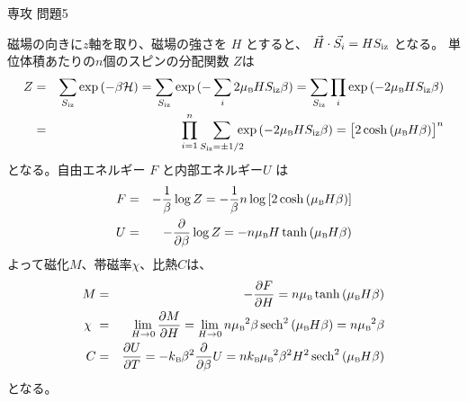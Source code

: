 \documentclass[fleqn]{jbook}
\begin{document}
\begin{answer}{専攻 問題5}{}
\def\sech{\mathop{\rm sech}\nolimits}

\begin{subanswers}
\SubAnswer
  磁場の向きに$z$軸を取り、磁場の強さを $H$ とすると、
  $\vec{H} \cdot \vec{S_i} = H S_{\rm iz}$ となる。
  単位体積あたりの$n$個のスピンの分配関数 $Z$は
%
  \begin{eqnarray*}
    Z &=& \sum_{S_{\rm iz}} \exp{(-\beta {\cal H})}%
       =  \sum_{S_{\rm iz}} \exp{(-\sum_{i}2\muB H S_{\rm iz} \beta)}%
       =  \sum_{S_{\rm iz}} \prod_{i} \exp{(-2\muB H S_{\rm iz} \beta)}\\
      &=& \prod_{i=1}^{n} \sum_{S_{\rm iz}=\pm 1/2}\bquad \exp{(-2\muB H S_{\rm iz} \beta)}%
       =  \bigl[ 2\cosh{(\muB H \beta)} \bigr]^n
  \end{eqnarray*}
%
  となる。自由エネルギー $F$ と内部エネルギー$U$ は
%
  \begin{eqnarray*}
    F &=& -\frac{1}{\beta} \log Z%
       =  -\frac{1}{\beta} n\log{[2\cosh{(\muB H \beta)}]}\\
    U &=& -\Partial{}{\beta} \log Z%
       =  -n \muB H \tanh{(\muB H \beta)}
  \end{eqnarray*}
%
  よって磁化$M$、帯磁率$\chi$、比熱$C$は、
%
  \begin{eqnarray*}
    M &=& - \Partial{F}{H}%
       =  n \muB\tanh{(\muB H \beta)} \\
 \chi\,\, &=& \lim_{H\to 0} \Partial{M}{H}%
       =  \lim_{H\to 0} n \muB^2 \beta \sech^2{(\muB H \beta)}%
       =  n \muB^2 \beta\\
    C &=& \Partial{U}{T}%
       = -\kB \beta^2 \Partial{}{\beta} U%
       = n \kB  \muB^2 \beta^2 H^2 \sech^2{(\muB H \beta)}
  \end{eqnarray*}
%
  となる。


\end{subanswers}
\end{answer}
\end{document}
